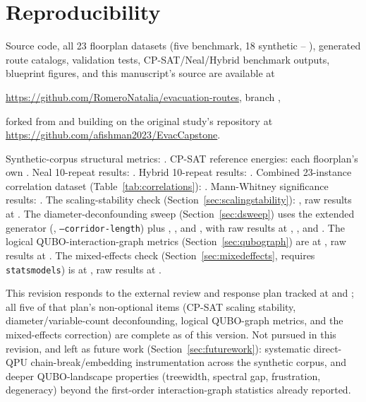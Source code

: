 \documentclass[11pt]{article}
\begin{document}
\section{Reproducibility}
Source code, all 23 floorplan datasets (five benchmark, 18 synthetic -- ), generated route catalogs, validation tests, CP-SAT/Neal/Hybrid benchmark outputs, blueprint figures, and this manuscript's source are available at
\begin{center}
\url{https://github.com/RomeroNatalia/evacuation-routes}, branch ,
\end{center}
forked from and building on the original study's repository at \url{https://github.com/afishman2023/EvacCapstone}.

Synthetic-corpus structural metrics: . CP-SAT reference energies: each floorplan's own . Neal 10-repeat results: . Hybrid 10-repeat results: . Combined 23-instance correlation dataset (Table~\ref{tab:correlations}): . Mann-Whitney significance results: . The scaling-stability check (Section~\ref{sec:scalingstability}): , raw results at . The diameter-deconfounding sweep (Section~\ref{sec:dsweep}) uses the extended generator (, \texttt{--corridor-length}) plus , , and , with raw results at , , and . The logical QUBO-interaction-graph metrics (Section~\ref{sec:qubograph}) are at , raw results at . The mixed-effects check (Section~\ref{sec:mixedeffects}, requires \texttt{statsmodels}) is at , raw results at .

This revision responds to the external review and response plan tracked at  and ; all five of that plan's non-optional items (CP-SAT scaling stability, diameter/variable-count deconfounding, logical QUBO-graph metrics, and the mixed-effects correction) are complete as of this version. Not pursued in this revision, and left as future work (Section~\ref{sec:futurework}): systematic direct-QPU chain-break/embedding instrumentation across the synthetic corpus, and deeper QUBO-landscape properties (treewidth, spectral gap, frustration, degeneracy) beyond the first-order interaction-graph statistics already reported.
\end{document}
